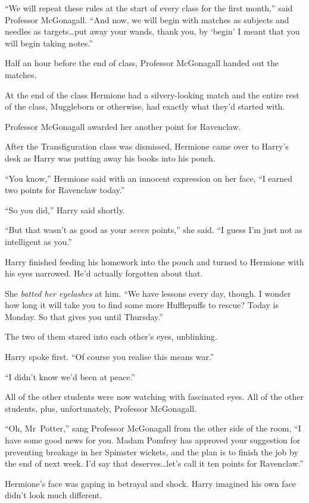 “We will repeat these rules at the start of every class for the first month,” said Professor McGonagall. “And now, we will begin with matches as subjects and needles as targets…put away your wands, thank you, by ‘begin’ I meant that you will begin taking notes.”

Half an hour before the end of class, Professor McGonagall handed out the matches.

At the end of the class Hermione had a silvery-looking match and the entire rest of the class, Muggleborn or otherwise, had exactly what they’d started with.

Professor McGonagall awarded her another point for Ravenclaw.

\later

After the Transfiguration class was dismissed, Hermione came over to Harry’s desk as Harry was putting away his books into his pouch.

“You know,” Hermione said with an innocent expression on her face, “I earned two points for Ravenclaw today.”

“So you did,” Harry said shortly.

“But that wasn’t as good as your \emph{seven} points,” she said. “I guess I’m just not as intelligent as you.”

Harry finished feeding his homework into the pouch and turned to Hermione with his eyes narrowed. He’d actually forgotten about that.

She \emph{batted her eyelashes} at him. “We have lessons every day, though. I wonder how long it will take you to find some more Hufflepuffs to rescue? Today is Monday. So that gives you until Thursday.”

The two of them stared into each other’s eyes, unblinking.

Harry spoke first. “Of course you realise this means war.”

“I didn’t know we’d been at peace.”

All of the other students were now watching with fascinated eyes. All of the other students, plus, unfortunately, Professor McGonagall.

“Oh, Mr~Potter,” sang Professor McGonagall from the other side of the room, “I have some good news for you. Madam Pomfrey has approved your suggestion for preventing breakage in her Spimster wickets, and the plan is to finish the job by the end of next week. I’d say that deserves…let’s call it ten points for Ravenclaw.”

Hermione’s face was gaping in betrayal and shock. Harry imagined his own face didn’t look much different.

